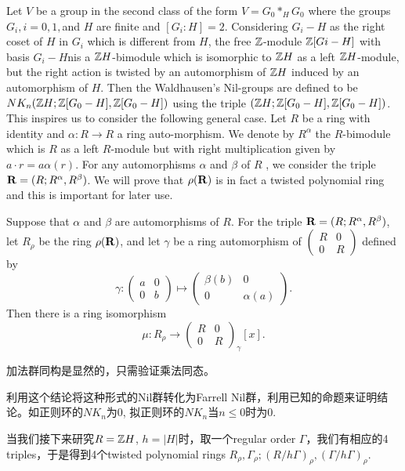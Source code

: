 Let $V$ be a group in the second class of the form $V = G_0*_H G_0$ where the groups $G_i,i = 0 , 1, $and $H$ are finite and $[G_i: H ] = 2$. Considering $G_i - H$ as the right coset of $H$ in $G_i$ which is different from $H$, the free $\mathbb{Z}$-module $\mathbb{Z}[Gi - H ]$ with basis $G_i - H $nis a $\mathbb{Z} H $-bimodule which is isomorphic to $\mathbb{Z} H$ as a left $\mathbb{Z} H$-module, but the right action is twisted by an automorphism of $\mathbb{Z} H$ induced by an automorphism of $H$. Then the Waldhausen's Nil-groups are defined to be $NK_n(\mathbb{Z} H ; \mathbb{Z}[G_0 - H ], \mathbb{Z}[G_0 - H ])$ using the triple $(\mathbb{Z} H ; \mathbb{Z}[G_0 - H ], \mathbb{Z}[G_0 - H ])$. This inspires us to consider the following general case. Let $R$ be a ring with identity and $\alpha : R \longrightarrow R$ a ring auto-morphism. We denote by $R^\alpha$ the $R$-bimodule which is $R$ as a left $R$-module but with right multiplication given by $a \cdot r = a\alpha(r)$. For any automorphisms $\alpha$ and $\beta$ of $ R$ , we consider the triple ${\bf R} = (R; R^\alpha,R^\beta)$. We will prove that $\rho({\bf R})$ is in fact a twisted polynomial ring and this is important for later use.

\begin{theorem}[3.1]
Suppose that $\alpha$ and $\beta$ are automorphisms of $R$. For the triple ${\bf R} = (R; R^\alpha,R^\beta)$, let $R_\rho$ be the ring $\rho({\bf R})$, and let $\gamma$ be a ring automorphism of
$\begin{pmatrix} R & 0 \\ 0 &  R \end{pmatrix}$
defined by
\[\gamma:\begin{pmatrix} a & 0 \\ 0 &  b \end{pmatrix} \mapsto \begin{pmatrix} \beta(b) & 0 \\ 0 &  \alpha(a) \end{pmatrix}.\]
Then there is a ring isomorphism
\[\mu:R_{\rho} \longrightarrow \begin{pmatrix} R & 0 \\ 0 &  R \end{pmatrix}_{\gamma}[x] .\]
\end{theorem}
加法群同构是显然的，只需验证乘法同态。

利用这个结论将这种形式的Nil群转化为Farrell Nil群，利用已知的命题来证明结论。如正则环的$NK_n$为$0$, 拟正则环的$NK_n$当$n\leq 0$时为$0$.

当我们接下来研究$R=\mathbb{Z} H$, $h=|H|$时，取一个regular order $\Gamma$，我们有相应的4 triples，于是得到4个twisted polynomial rings $R_\rho, \Gamma_\rho; (R/h\Gamma)_\rho, (\Gamma/h\Gamma)_\rho$.

